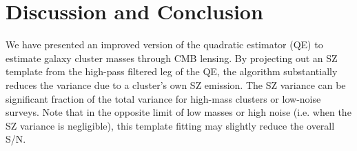 \section{Discussion and Conclusion}
\label{conclusions}

We have presented an improved version of the quadratic estimator (QE) to estimate galaxy cluster masses through CMB lensing. 
By projecting out an SZ template from the high-pass filtered leg of the QE, the algorithm substantially reduces the variance due to a cluster's own SZ emission. 
The SZ variance can be significant fraction of the total variance for high-mass clusters or low-noise surveys. 
Note that in the opposite limit of low masses or high noise (i.e. when the SZ variance is negligible), this template fitting may slightly reduce the overall S/N. 

